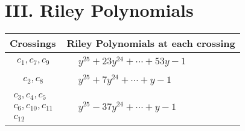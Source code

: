 \documentclass[1p]{elsarticle_modified}
\theoremstyle{definition}
\begin{document}
\centering \section*{ III. Riley Polynomials}
\begin{tabular}{m{50pt}|m{274pt}}
Crossings & \hspace{64pt}Riley Polynomials at each crossing \\
\hline $$\begin{aligned}c_{1},c_{7},c_{9}\end{aligned}$$&$\begin{aligned}
&y^{25}+23 y^{24}+\cdots+53 y-1
\end{aligned}$\\
\hline $$\begin{aligned}c_{2},c_{8}\end{aligned}$$&$\begin{aligned}
&y^{25}+7 y^{24}+\cdots+y-1
\end{aligned}$\\
\hline $$\begin{aligned}c_{3},c_{4},c_{5}\\c_{6},c_{10},c_{11}\\c_{12}\end{aligned}$$&$\begin{aligned}
&y^{25}-37 y^{24}+\cdots+y-1
\end{aligned}$\\
\hline
\end{tabular}
\vskip 2pc
\end{document}
